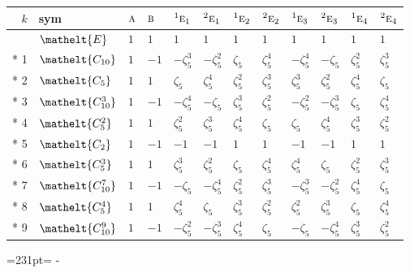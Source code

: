 \documentclass[10pt,a4paper]{article}
\newcommand{\needspace}[1]{\par\penalty-100\begingroup\dimen0=#1\relax\dimen2=\pagegoal
  \advance\dimen2-\pagetotal\ifdim\dimen0>\dimen2\relax\ifdim\dimen2>0pt\vfil\break\fi\fi
  \endgroup}
\numberwithin{equation}{section}
\newcommand{\eltfont}[1]{{\let\sigma\eltsigma\mathelt{#1}}}
\newcommand{\irr}[1]{\text{\normalfont\scshape #1}}
\newcommand{\conjpair}[1]{{}^{#1}}
\newcommand{\cls}[1]{\eltfont{#1}}
\newcommand{\rootunity}[1]{\zeta_{#1}}
\begin{document}
{\small\setlength{\tabcolsep}{4pt}
\begin{longtable}{@{}rlllllllllll@{}}\toprule
$k$ & sym & $\irr{a}$ & $\irr{b}$ & $\conjpair{1}\irr{e}_{1}$ & $\conjpair{2}\irr{e}_{1}$ & $\conjpair{1}\irr{e}_{2}$ & $\conjpair{2}\irr{e}_{2}$ & $\conjpair{1}\irr{e}_{3}$ & $\conjpair{2}\irr{e}_{3}$ & $\conjpair{1}\irr{e}_{4}$ & $\conjpair{2}\irr{e}_{4}$\\\midrule\endhead
\bottomrule\endfoot\endlastfoot
0 & $\cls{E}$ & $1$ & $1$ & $1$ & $1$ & $1$ & $1$ & $1$ & $1$ & $1$ & $1$\\*
1 & $\cls{C_{10}}$ & $1$ & $-1$ & $-\rootunity{5}^{3}$ & $-\rootunity{5}^{2}$ & $\rootunity{5}$ & $\rootunity{5}^{4}$ & $-\rootunity{5}^{4}$ & $-\rootunity{5}$ & $\rootunity{5}^{2}$ & $\rootunity{5}^{3}$\\*
2 & $\cls{C_{5}}$ & $1$ & $1$ & $\rootunity{5}$ & $\rootunity{5}^{4}$ & $\rootunity{5}^{2}$ & $\rootunity{5}^{3}$ & $\rootunity{5}^{3}$ & $\rootunity{5}^{2}$ & $\rootunity{5}^{4}$ & $\rootunity{5}$\\*
3 & $\cls{C_{10}^{3}}$ & $1$ & $-1$ & $-\rootunity{5}^{4}$ & $-\rootunity{5}$ & $\rootunity{5}^{3}$ & $\rootunity{5}^{2}$ & $-\rootunity{5}^{2}$ & $-\rootunity{5}^{3}$ & $\rootunity{5}$ & $\rootunity{5}^{4}$\\*
4 & $\cls{C_{5}^{2}}$ & $1$ & $1$ & $\rootunity{5}^{2}$ & $\rootunity{5}^{3}$ & $\rootunity{5}^{4}$ & $\rootunity{5}$ & $\rootunity{5}$ & $\rootunity{5}^{4}$ & $\rootunity{5}^{3}$ & $\rootunity{5}^{2}$\\*
5 & $\cls{C_{2}}$ & $1$ & $-1$ & $-1$ & $-1$ & $1$ & $1$ & $-1$ & $-1$ & $1$ & $1$\\*
6 & $\cls{C_{5}^{3}}$ & $1$ & $1$ & $\rootunity{5}^{3}$ & $\rootunity{5}^{2}$ & $\rootunity{5}$ & $\rootunity{5}^{4}$ & $\rootunity{5}^{4}$ & $\rootunity{5}$ & $\rootunity{5}^{2}$ & $\rootunity{5}^{3}$\\*
7 & $\cls{C_{10}^{7}}$ & $1$ & $-1$ & $-\rootunity{5}$ & $-\rootunity{5}^{4}$ & $\rootunity{5}^{2}$ & $\rootunity{5}^{3}$ & $-\rootunity{5}^{3}$ & $-\rootunity{5}^{2}$ & $\rootunity{5}^{4}$ & $\rootunity{5}$\\*
8 & $\cls{C_{5}^{4}}$ & $1$ & $1$ & $\rootunity{5}^{4}$ & $\rootunity{5}$ & $\rootunity{5}^{3}$ & $\rootunity{5}^{2}$ & $\rootunity{5}^{2}$ & $\rootunity{5}^{3}$ & $\rootunity{5}$ & $\rootunity{5}^{4}$\\*
9 & $\cls{C_{10}^{9}}$ & $1$ & $-1$ & $-\rootunity{5}^{2}$ & $-\rootunity{5}^{3}$ & $\rootunity{5}^{4}$ & $\rootunity{5}$ & $-\rootunity{5}$ & $-\rootunity{5}^{4}$ & $\rootunity{5}^{3}$ & $\rootunity{5}^{2}$\\
\bottomrule\end{longtable}}
\needspace{231pt}
\end{document}
